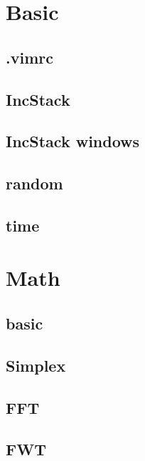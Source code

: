 \section{Basic}
\subsection{.vimrc}

\subsection{IncStack}

\subsection{IncStack windows}

\subsection{random}

\subsection{time}


\section{Math}
\subsection{basic}

\subsection{Simplex}

\subsection{FFT}

\subsection{FWT}

%
